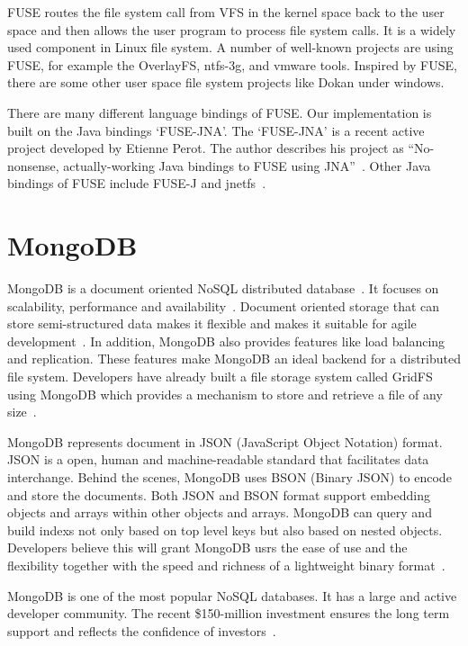     FUSE routes the file system call from VFS in the kernel space back to the user space and then allows the user program to process file system calls. It is a widely used component in Linux file system. A number of well-known projects are using FUSE, for example the OverlayFS, ntfs-3g, and vmware tools. Inspired by FUSE, there are some other user space file system projects like Dokan under windows.

    There are many different language bindings of FUSE. Our implementation is built on the Java bindings `FUSE-JNA'. The `FUSE-JNA' is a recent active project developed by Etienne Perot. The author describes his project as ``No-nonsense, actually-working Java bindings to FUSE using JNA''~\cite{fusejna}. Other Java bindings of FUSE include FUSE-J and jnetfs~\cite{jnetfs}.

\section{MongoDB}

    MongoDB is a document oriented NoSQL distributed database~\cite{mongo_overview}. It focuses on scalability, performance and availability~\cite{mongo_overview}. Document oriented storage that can store semi-structured data makes it flexible and makes it suitable for agile development~\cite{docdb}. In addition, MongoDB also provides features like load balancing and replication. These features make MongoDB an ideal backend for a distributed file system. Developers have already built a file storage system called GridFS using MongoDB which provides a mechanism to store and retrieve a file of any size~\cite{gridfs}.

    MongoDB represents document in JSON (JavaScript Object Notation) format. JSON is a open, human and machine-readable standard that facilitates data interchange. Behind the scenes, MongoDB uses BSON (Binary JSON) to encode and store the documents. Both JSON and BSON format support embedding objects and arrays within other objects and arrays. MongoDB can query and build indexs not only based on top level keys but also based on nested objects. Developers believe this will grant MongoDB usrs the ease of use and the flexibility together with the speed and richness of a lightweight binary format~\cite{bson}.

    MongoDB is one of the most popular NoSQL databases. It has a large and active developer community. The recent \$150-million investment ensures the long term support and reflects the confidence of investors~\cite{mongInvest}.

